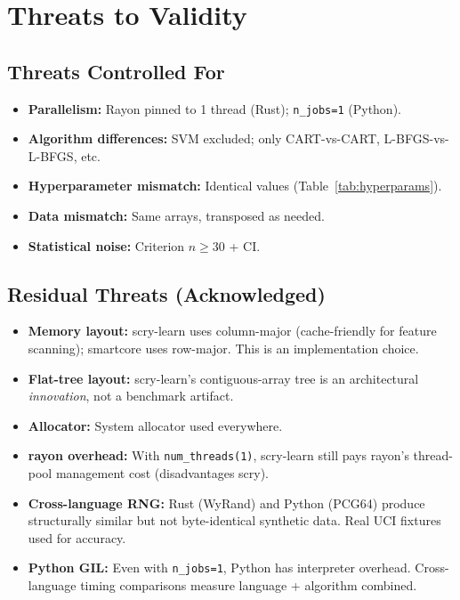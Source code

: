 \documentclass[11pt,a4paper]{article}
\begin{document}
\section{Threats to Validity}

\subsection{Threats Controlled For}

\begin{itemize}[nosep]
    \item \textbf{Parallelism:} Rayon pinned to 1 thread (Rust);
          \texttt{n\_jobs=1} (Python).
    \item \textbf{Algorithm differences:} SVM excluded; only
          CART-vs-CART, L-BFGS-vs-L-BFGS, etc.
    \item \textbf{Hyperparameter mismatch:} Identical values
          (Table~\ref{tab:hyperparams}).
    \item \textbf{Data mismatch:} Same arrays, transposed as needed.
    \item \textbf{Statistical noise:} Criterion $n \geq 30$ + CI.
\end{itemize}

\subsection{Residual Threats (Acknowledged)}

\begin{itemize}[nosep]
    \item \textbf{Memory layout:} scry-learn uses column-major
          (cache-friendly for feature scanning); smartcore uses
          row-major. This is an implementation choice.
    \item \textbf{Flat-tree layout:} scry-learn's contiguous-array
          tree is an architectural \emph{innovation}, not a
          benchmark artifact.
    \item \textbf{Allocator:} System allocator used everywhere.
    \item \textbf{rayon overhead:} With \texttt{num\_threads(1)},
          scry-learn still pays rayon's thread-pool management
          cost (disadvantages scry).
    \item \textbf{Cross-language RNG:} Rust (WyRand) and Python
          (PCG64) produce structurally similar but not byte-identical
          synthetic data. Real UCI fixtures used for accuracy.
    \item \textbf{Python GIL:} Even with \texttt{n\_jobs=1}, Python
          has interpreter overhead. Cross-language timing comparisons
          measure language + algorithm combined.
\end{itemize}
\end{document}
